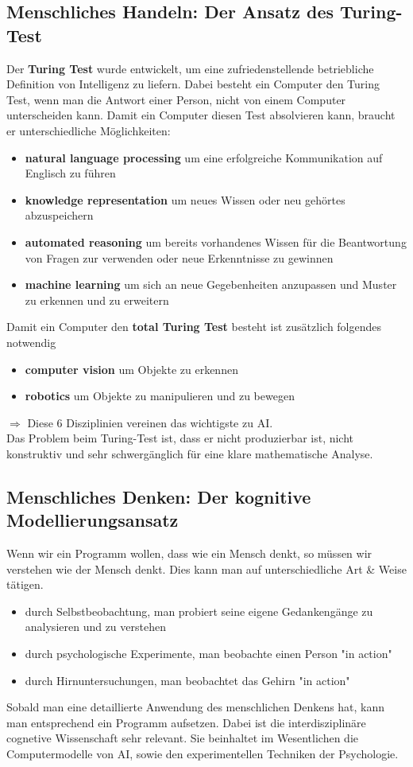 \documentclass{article}
\theoremstyle{merke}
\theoremstyle{definition}
\begin{document}
\subsection{Menschliches Handeln: Der Ansatz des Turing-Test}
Der \textbf{Turing Test} wurde entwickelt, um eine zufriedenstellende betriebliche Definition von Intelligenz zu liefern. Dabei besteht ein Computer den Turing Test, wenn man die Antwort einer Person, nicht von einem Computer unterscheiden kann. Damit ein Computer diesen Test absolvieren kann, braucht er unterschiedliche Möglichkeiten:
\begin{itemize}
	\item \textbf{natural language processing} um eine erfolgreiche Kommunikation auf Englisch zu führen
	\item \textbf{knowledge representation} um neues Wissen oder neu gehörtes abzuspeichern
	\item \textbf{automated reasoning} um bereits vorhandenes Wissen für die Beantwortung von Fragen zur verwenden oder neue Erkenntnisse zu gewinnen
	\item \textbf{machine learning} um sich an neue Gegebenheiten anzupassen und Muster zu erkennen und zu erweitern
\end{itemize}
Damit ein Computer den \textbf{total Turing Test} besteht ist zusätzlich folgendes notwendig
\begin{itemize}
	\item \textbf{computer vision} um Objekte zu erkennen
	\item \textbf{robotics} um Objekte zu manipulieren und zu bewegen
\end{itemize}
$\Rightarrow$ Diese 6 Disziplinien vereinen das wichtigste zu AI.\\
Das Problem beim Turing-Test ist, dass er nicht produzierbar ist, nicht konstruktiv und sehr schwergänglich für eine klare mathematische Analyse.

\subsection{Menschliches Denken: Der kognitive Modellierungsansatz}
Wenn wir ein Programm wollen, dass wie ein Mensch denkt, so müssen wir verstehen wie der Mensch denkt. Dies kann man auf unterschiedliche Art \& Weise tätigen. 
\begin{itemize}
	\item durch Selbstbeobachtung, man probiert seine eigene Gedankengänge zu analysieren und zu verstehen
	\item durch psychologische Experimente, man beobachte einen Person "in action"
	\item durch Hirnuntersuchungen, man beobachtet das Gehirn "in action"
\end{itemize}
Sobald man eine detaillierte Anwendung des menschlichen Denkens hat, kann man entsprechend ein Programm aufsetzen. Dabei ist die interdisziplinäre cognetive Wissenschaft sehr relevant. Sie beinhaltet im Wesentlichen die Computermodelle von AI, sowie den experimentellen Techniken der Psychologie.
\end{document}
